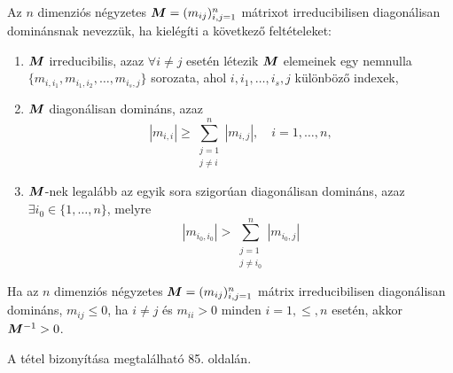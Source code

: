 \begin{definition}\label{irrdiagdomdef}
	Az  $n$ dimenziós négyzetes $\bm{M} = (m_{ij})_{i,j=1}^n$ mátrixot irreducibilisen diagonálisan dominánsnak nevezzük, ha kielégíti a következő feltételeket:
	\begin{enumerate}[label=(\alph*)]
		\item $\bm{M}$ irreducibilis, azaz $\forall i \neq j$ esetén létezik $\bm{M}$ elemeinek egy nemnulla $ \{m_{i,i_1}, m_{i_1,i_2}, \ldots, m_{i_s,j} \}$ sorozata, ahol $i, i_1, \ldots, i_s, j$ különböző indexek,\label{irredfelt}
		\item $\bm{M}$ diagonálisan domináns, azaz  \label{diagdomfelt}
			\begin{equation*}
				|m_{i,i}| \geq \sum_{\substack{j = 1 \\ j \neq i}}^n |m_{i,j}|, \quad i = 1, \ldots, n,
			\end{equation*}
		\item $\bm{M}$-nek legalább az egyik sora szigorúan diagonálisan domináns, azaz $\exists i_0 \in \{1, \ldots, n\}$, melyre \label{szigdiagdomfelt}
			\begin{equation*}
				|m_{i_0,i_0}|  > \sum_{\substack{j = 1 \\ j \neq i_0}}^n |m_{i_0,j}|
			\end{equation*}
	\end{enumerate}
\end{definition}

\begin{theorem}\label{poz_inverz_tetel}
	Ha az  $n$ dimenziós négyzetes $\bm{M} = (m_{ij})_{i,j=1}^n$ mátrix irreducibilisen diagonálisan domináns,  $m_{ij} \leq 0$, ha $i \neq j$ és $m_{ii} > 0$ minden $i = 1, \leq, n$ esetén, akkor $\bm{M}^{-1} > 0$.
\end{theorem}

A tétel bizonyítása megtalálható \cite{varga} 85. oldalán. 
 	
